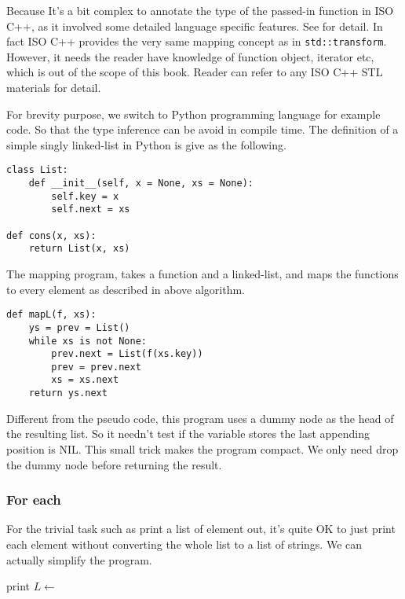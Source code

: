 \documentclass{article}
\begin{document}
Because It's a bit complex to annotate the type of the passed-in function in ISO C++, as it
involved some detailed language specific features. See \cite{sgi-stl-transform} for detail. 
In fact ISO C++ provides the very same mapping concept as in \verb|std::transform|. However, 
it needs the reader have knowledge of function object, iterator etc, which is out of the
scope of this book. Reader can refer to any ISO C++ STL materials for detail.

For brevity purpose, we switch to Python programming language for example code. So that the type inference
can be avoid in compile time. The definition of a simple singly linked-list in Python is give as the 
following.

\lstset{language=Python}
\begin{lstlisting}
class List:
    def __init__(self, x = None, xs = None):
        self.key = x
        self.next = xs

def cons(x, xs):
    return List(x, xs)
\end{lstlisting}

The mapping program, takes a function and a linked-list, and maps the functions to every element as described
in above algorithm.

\begin{lstlisting}
def mapL(f, xs):
    ys = prev = List()
    while xs is not None:
        prev.next = List(f(xs.key))
        prev = prev.next
        xs = xs.next
    return ys.next
\end{lstlisting}

Different from the pseudo code, this program uses a dummy node as the head of the resulting list. So it needn't
test if the variable stores the last appending position is NIL. This small trick makes the program compact. 
We only need drop the dummy node before returning the result.

\subsubsection{For each}

For the trivial task such as print a list of element out, it's quite OK to just print each element without 
converting the whole list to a list of strings. We can actually simplify the program.

\begin{algorithmic}
    \State print 
    \State $L \gets$ 
  \EndWhile
\EndFunction
\end{algorithmic}
\end{document}
